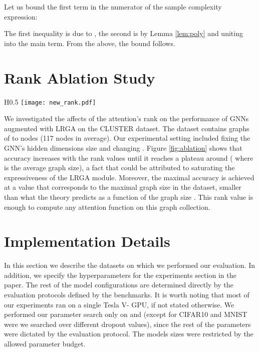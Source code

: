 \documentclass{article} \usepackage{iclr2021_conference,times}
\begin{document}
Let us bound the first term in the numerator of the sample complexity expression:


The first inequality is due to , the second is by Lemma \ref{lem:poly} and uniting  into the main term. From the above, the bound follows. 



\section{Rank Ablation Study}\label{sec: Rank_ablation}
\begin{wrapfigure}[17]{H}{0.5\textwidth}
\vspace{-14pt}
\captionsetup{font=footnotesize}
\vspace{-10pt}
\texttt{[image: new\_rank.pdf]}
\vspace{-7pt}
\caption{Ablation study on CLUSTER dataset. The X-axis represent the ratio between the rank parameter  and the average graph size . The Y-axis represent the network's accuracy}\label{fig:ablation}
\end{wrapfigure}

We investigated the affects of the attention's rank  on the performance of GNNs augmented with LRGA on the CLUSTER dataset. The dataset contains graphs of  to  nodes (117 nodes in average). Our experimental setting included fixing the GNN's hidden dimensions size and changing . Figure \ref{fig:ablation} shows that accuracy increases with the rank values until it reaches a plateau around  ( where  is the average graph size), a fact that could be attributed to saturating the expressiveness of the LRGA module. Moreover, the maximal accuracy is achieved at a value that corresponds to the maximal graph size in the dataset, smaller than what the theory predicts as a function of the graph size . This rank value is enough to compute any attention function on this graph collection. 


\section{Implementation Details}
In this section we describe the datasets on which we performed our evaluation. In addition, we specify the hyperparameters for the experiments section in the paper. The rest of the model configurations are determined directly by the evaluation protocols defined by the benchmarks. It is worth noting that most of our experiments ran on a single Tesla V- GPU, if not stated otherwise. We performed our parameter search only on  and  (except for CIFAR10 and MNIST were we searched over different dropout values), since the rest of the parameters were dictated by the evaluation protocol. The models sizes were restricted by the allowed parameter budget.
\end{document}
